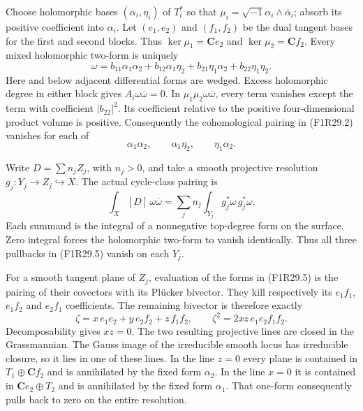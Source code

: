 Choose holomorphic bases $(\alpha_i,\eta_i)$ of
$T_i^*$ so that $\mu_i=\sqrt{-1}\alpha_i\wedge
\overline\alpha_i$; absorb its positive
coefficient into $\alpha_i$. Let $(e_1,e_2)$
and $(f_1,f_2)$ be the dual tangent bases for
the first and second blocks. Thus
$\ker\mu_1=\mathbf C e_2$ and
$\ker\mu_2=\mathbf C f_2$.
Every mixed holomorphic two-form is uniquely
\[
 \omega=b_{11}\alpha_1\alpha_2
       +b_{12}\alpha_1\eta_2
       +b_{21}\eta_1\alpha_2
       +b_{22}\eta_1\eta_2.
 \tag{F1R29.4}
\]
Here and below adjacent differential forms are
wedged. Excess holomorphic degree in either
block gives $A_i\omega\overline\omega=0$.
In $\mu_1\mu_2\omega\overline\omega$, every
term vanishes except the term with coefficient
$|b_{22}|^2$. Its coefficient relative to the
positive four-dimensional product volume is
positive. Consequently the cohomological
pairing in (F1R29.2) vanishes for each of
\[
       \alpha_1\alpha_2,\qquad
       \alpha_1\eta_2,\qquad
       \eta_1\alpha_2.
 \tag{F1R29.5}
\]

Write $D=\sum n_j Z_j$, with $n_j>0$, and take
a smooth projective resolution
$g_j:Y_j\to Z_j\hookrightarrow X$.
The actual cycle-class pairing is
\[
 \int_X[D]\,\omega\overline\omega
   =\sum_j n_j\int_{Y_j}g_j^*\omega\,
                                  \overline{g_j^*\omega}.
 \tag{F1R29.6}
\]
Each summand is the integral of a nonnegative
top-degree form on the surface. Zero integral
forces the holomorphic two-form to vanish
identically. Thus all three pullbacks in
(F1R29.5) vanish on each $Y_j$.

For a smooth tangent plane of $Z_j$, evaluation
of the forms in (F1R29.5) is the pairing of
their covectors with its Pl\"ucker bivector.
They kill respectively its $e_1f_1$, $e_1f_2$
and $e_2f_1$ coefficients. The remaining
bivector is therefore exactly
\[
        \zeta=x\,e_1e_2+y\,e_2f_2+z\,f_1f_2,
       \qquad
        \zeta^2=2xz\,e_1e_2f_1f_2.
 \tag{F1R29.7}
\]
Decomposability gives $xz=0$. The two resulting
projective lines are closed in the Grassmannian.
The Gauss image of the irreducible smooth locus
has irreducible closure, so it lies in one of
these lines. In the line $z=0$ every plane is
contained in $T_1\oplus\mathbf C f_2$ and is
annihilated by the fixed form $\alpha_2$.
In the line $x=0$ it is contained in
$\mathbf C e_2\oplus T_2$ and is annihilated
by the fixed form $\alpha_1$.
That one-form consequently pulls back to zero
on the entire resolution.

